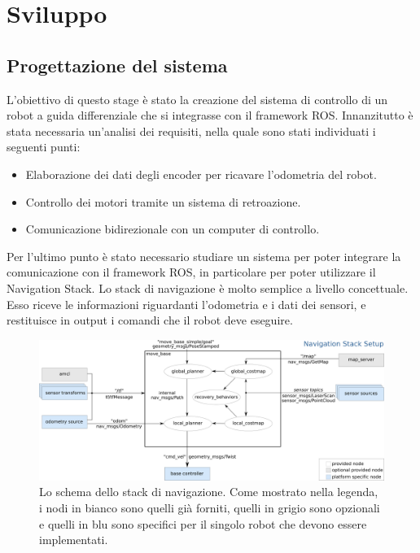 \chapter{Sviluppo}

\section{Progettazione del sistema}
L'obiettivo di questo stage è stato la creazione del sistema di controllo di un robot a guida differenziale che si integrasse con il framework ROS.
Innanzitutto è stata necessaria un'analisi dei requisiti, nella quale sono stati individuati i seguenti punti: 
\begin{itemize}
    \item Elaborazione dei dati degli encoder per ricavare l'odometria del robot.
    \item Controllo dei motori tramite un sistema di retroazione.
    \item Comunicazione bidirezionale con un computer di controllo.
\end{itemize}

Per l'ultimo punto è stato necessario studiare un sistema per poter integrare la comunicazione con il framework ROS, in particolare per poter utilizzare il Navigation Stack.
Lo stack di navigazione è molto semplice a livello concettuale. Esso riceve le informazioni riguardanti l'odometria e i dati dei sensori, e restituisce in output i comandi che il robot deve eseguire.

\begin{figure}[h]
    \centering
    \includegraphics[width=\textwidth]{images/navigation_stack.png}
    \caption{Lo schema dello stack di navigazione. Come mostrato nella legenda, i nodi in
bianco sono quelli già forniti, quelli in grigio sono opzionali e quelli in blu sono specifici per il singolo robot che devono essere implementati.}
  \label{fig:navigation_stack}
\end{figure}

